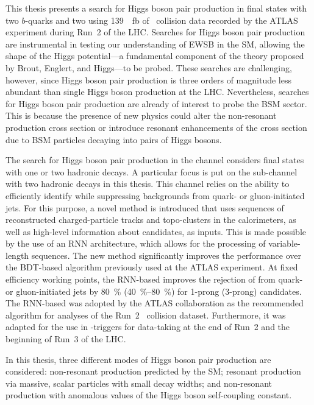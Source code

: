 This thesis presents a search for Higgs boson pair production in final states
with two $b$-quarks and two \tauleptons using \SI{139}{\per\femto\barn} of
\pp~collision data recorded by the ATLAS experiment during Run~2 of the
LHC. Searches for Higgs boson pair production are instrumental in testing our
understanding of EWSB in the SM, allowing the shape of the Higgs potential---a
fundamental component of the theory proposed by Brout, Englert, and Higgs---to
be probed. These searches are challenging, however, since Higgs boson pair
production is three orders of magnitude less abundant than single Higgs boson
production at the LHC. Nevertheless, searches for Higgs boson pair production
are already of interest to probe the BSM sector. This is because the presence of
new physics could alter the non-resonant \HH production cross section or
introduce resonant enhancements of the cross section due to BSM particles
decaying into pairs of Higgs bosons.


The search for Higgs boson pair production in the \bbtautau channel considers
final states with one or two hadronic \taulepton decays. A particular focus is
put on the sub-channel with two hadronic \taulepton decays in this thesis. This
channel relies on the ability to efficiently identify \tauhadvis while
suppressing backgrounds from quark- or gluon-initiated jets. For this purpose, a
novel \tauid method is introduced that uses sequences of reconstructed
charged-particle tracks and topo-clusters in the calorimeters, as well as
high-level information about \tauhadvis candidates, as inputs. This is made
possible by the use of an RNN architecture, which allows for the processing of
variable-length sequences. The new method significantly improves the \tauid
performance over the BDT-based algorithm previously used at the ATLAS
experiment. At fixed \tauhadvis efficiency working points, the RNN-based \tauid
improves the rejection of \faketauhadvis from quark- or gluon-initiated jets by
\SI{80}{\percent} (\SIrange{40}{80}{\percent}) for 1-prong (3-prong) \tauhadvis
candidates.
The RNN-based \tauid was adopted by the ATLAS collaboration as the recommended
\tauid algorithm for analyses of the Run~2 \pp~collision dataset. Furthermore,
it was adapted for the use in \tauhadvis-triggers for data-taking at the end of
Run~2 and the beginning of Run~3 of the LHC.


In this thesis, three different modes of Higgs boson pair production are
considered: non-resonant \HH production predicted by the SM; resonant \HH
production via massive, scalar particles with small decay widths; and
non-resonant \HH production with anomalous values of the Higgs boson
self-coupling constant.


